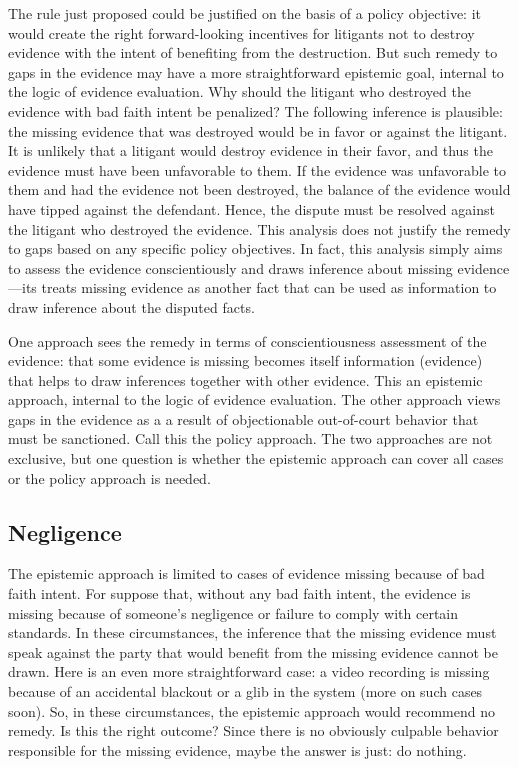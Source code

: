 \documentclass[
  10pt,
  dvipsnames,enabledeprecatedfontcommands]{scrartcl}
\begin{document}
The rule just proposed could be justified on the basis of a policy
objective: it would create the right forward-looking incentives for
litigants not to destroy evidence with the intent of benefiting from the
destruction. But such remedy to gaps in the evidence may have a more
straightforward epistemic goal, internal to the logic of evidence
evaluation. Why should the litigant who destroyed the evidence with bad
faith intent be penalized? The following inference is plausible: the
missing evidence that was destroyed would be in favor or against the
litigant. It is unlikely that a litigant would destroy evidence in their
favor, and thus the evidence must have been unfavorable to them. If the
evidence was unfavorable to them and had the evidence not been
destroyed, the balance of the evidence would have tipped against the
defendant. Hence, the dispute must be resolved against the litigant who
destroyed the evidence. This analysis does not justify the remedy to
gaps based on any specific policy objectives. In fact, this analysis
simply aims to assess the evidence conscientiously and draws inference
about missing evidence---its treats missing evidence as another fact
that can be used as information to draw inference about the disputed
facts.

One approach sees the remedy in terms of conscientiousness assessment of
the evidence: that some evidence is missing becomes itself information
(evidence) that helps to draw inferences together with other evidence.
This an epistemic approach, internal to the logic of evidence
evaluation. The other approach views gaps in the evidence as a a result
of objectionable out-of-court behavior that must be sanctioned. Call
this the policy approach. The two approaches are not exclusive, but one
question is whether the epistemic approach can cover all cases or the
policy approach is needed.

\hypertarget{negligence}{%
\subsection{Negligence}\label{negligence}}

The epistemic approach is limited to cases of evidence missing because
of bad faith intent. For suppose that, without any bad faith intent, the
evidence is missing because of someone's negligence or failure to comply
with certain standards. In these circumstances, the inference that the
missing evidence must speak against the party that would benefit from
the missing evidence cannot be drawn. Here is an even more
straightforward case: a video recording is missing because of an
accidental blackout or a glib in the system (more on such cases soon).
So, in these circumstances, the epistemic approach would recommend no
remedy. Is this the right outcome? Since there is no obviously culpable
behavior responsible for the missing evidence, maybe the answer is just:
do nothing.
\end{document}
